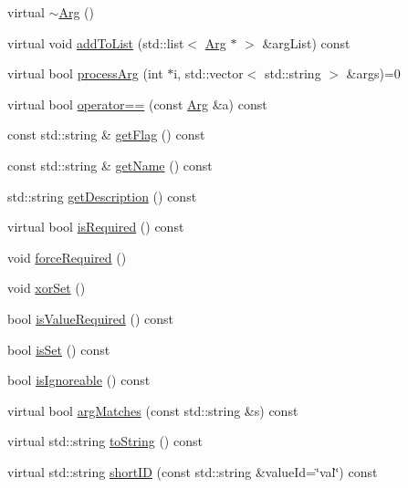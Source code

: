 \begin{DoxyCompactItemize}
\item 
virtual \hyperlink{class_t_c_l_a_p_1_1_arg_a15734a7cf52c8c4ab6df70f0997bbee3}{$\sim$\+Arg} ()
\item 
virtual void \hyperlink{class_t_c_l_a_p_1_1_arg_a9ff1564beeea2ef855f7fa483c37d0e2}{add\+To\+List} (std\+::list$<$ \hyperlink{class_t_c_l_a_p_1_1_arg}{Arg} $\ast$ $>$ \&arg\+List) const 
\item 
virtual bool \hyperlink{class_t_c_l_a_p_1_1_arg_a61ffe2f660a76111d256f7b22a686146}{process\+Arg} (int $\ast$i, std\+::vector$<$ std\+::string $>$ \&args)=0
\item 
virtual bool \hyperlink{class_t_c_l_a_p_1_1_arg_a657a8d2842b7de9ced5a5a55db01d367}{operator==} (const \hyperlink{class_t_c_l_a_p_1_1_arg}{Arg} \&a) const 
\item 
const std\+::string \& \hyperlink{class_t_c_l_a_p_1_1_arg_a22f616e81a423e794f13a9ae1549ac77}{get\+Flag} () const 
\item 
const std\+::string \& \hyperlink{class_t_c_l_a_p_1_1_arg_a641ced141a56c74fee11d3e3a808f731}{get\+Name} () const 
\item 
std\+::string \hyperlink{class_t_c_l_a_p_1_1_arg_a1943999fadcb4f28cecd6ba55ed0b085}{get\+Description} () const 
\item 
virtual bool \hyperlink{class_t_c_l_a_p_1_1_arg_a00a3cfdb2b6e9a111ad39cbd4978b96c}{is\+Required} () const 
\item 
void \hyperlink{class_t_c_l_a_p_1_1_arg_a58e3de560f364d0bb6bdf36ab533a6fd}{force\+Required} ()
\item 
void \hyperlink{class_t_c_l_a_p_1_1_arg_aec525c8092e56f7f5aa455e71bc72374}{xor\+Set} ()
\item 
bool \hyperlink{class_t_c_l_a_p_1_1_arg_a1373d50d4b93c16db43c7600cf6d0355}{is\+Value\+Required} () const 
\item 
bool \hyperlink{class_t_c_l_a_p_1_1_arg_a6af7a1e92b5d92fc2d90c1a95aab4384}{is\+Set} () const 
\item 
bool \hyperlink{class_t_c_l_a_p_1_1_arg_a33816b5ccc58a15f3a998480e5d988e2}{is\+Ignoreable} () const 
\item 
virtual bool \hyperlink{class_t_c_l_a_p_1_1_arg_aac37b1b734b477e5d16f2037dba9c125}{arg\+Matches} (const std\+::string \&s) const 
\item 
virtual std\+::string \hyperlink{class_t_c_l_a_p_1_1_arg_ac98a357568c21f0eb6ca2220b8a3d4a2}{to\+String} () const 
\item 
virtual std\+::string \hyperlink{class_t_c_l_a_p_1_1_arg_aef8efaf3811162b2b2b2a84c6db280fa}{short\+I\+D} (const std\+::string \&value\+Id=\char`\"{}val\char`\"{}) const 

\end{DoxyCompactItemize}
